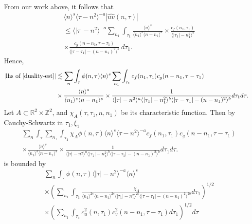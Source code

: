 \documentclass[12pt,reqno]{amsart}
\numberwithin{equation}{section}  %
\newcommand{\rr}{\mathbb{R}}
\newcommand{\zz}{\mathbb{Z}}
\newcommand{\wh}{\widehat}
\begin{document}
%
%
From our work above, it follows that 
%
%
\begin{equation}
	\label{convo-est-starting-pnt}
	\begin{split}
		 & \langle n \rangle^s \langle \tau - n^{2} \rangle^{-a} | \wh{uv}\left( 
		n, \tau \right) |
		\\
		& \le \langle |\tau| - n^{2} \rangle^{-a}
		\sum_{n_{1}} \int_{\tau_{1}} \frac{\langle n \rangle^{s}}{\langle n_1 \rangle^s
    \langle n - n_1 \rangle^s} 
		\times \frac{c_f(n_1, \tau_1)}{\langle |\tau_1| - n_1^{2} \rangle ^{b}}
		\\
		& \times
		\frac{c_g(n - n_1, \tau - \tau_1 )}{\langle |\tau - \tau_1| - (n - n_1)^{2}
    \rangle^{b}}\ d \tau_1.
	\end{split}
\end{equation}
%
%
Hence, 
%
%
\begin{equation}
  \label{pre-fubini-int-form}
	\begin{split}
    |\text{lhs of} \ \eqref{duality-est}|
	& \lesssim \sum_{n} \int_{\tau} \phi(n, \tau) \langle n \rangle^s 
  \sum_{n_{1}}
  \int_{\tau_{1}} c_f(n_1, \tau_1)
		c_g(n - n_1, \tau - \tau_1 )
		\\
    & \times \frac{\langle n \rangle ^{s}}{\langle n_{1} \rangle ^{s} \langle
    n-n_{1} \rangle ^{s}} \times \frac{1}{\langle |\tau| - n^{2} \rangle
    ^{a}\langle |\tau_{1}|-n_{1}^{2} \rangle ^{b}\langle | \tau -
    \tau_{1}|-(n - n_{1})^{2}
    \rangle ^{b}} d \tau_1 d \tau.
	\end{split}
\end{equation}
%
Let $A \subset \rr^{2} \times \zz^{2}$, and $\chi_{A}(\tau, \tau_{1}, n, n_{1})$
be its
characteristic function. Then by Cauchy-Schwartz in
$\tau_{1}, \xi_{1}$
\begin{equation*}
	\begin{split}
    & \sum_{n} \int_{\tau}   \sum_{n_{1}}
    \int_{\tau_{1}} \chi_{A}
    \phi(n, \tau) \langle n \rangle^s \langle \tau - n^{2} \rangle^{-a}
  c_f(n_1, \tau_1)
		c_g(n - n_1, \tau - \tau_1 )
		\\
    & \times \frac{\langle n \rangle ^{s}}{\langle n_{1} \rangle ^{s} \langle
    n-n_{1} \rangle ^{s}} \times \frac{1}{\langle |\tau| - n^{2} \rangle
    ^{a}\langle |\tau_{1}|-n_{1}^{2} \rangle ^{b}\langle | \tau -
    \tau_{1}|-(n - n_{1})^{2}
    \rangle ^{b}} d \tau_1 d \tau.
	\end{split}
\end{equation*}
%
is bounded by 
%
%
\begin{equation}
	\label{10g}
	\begin{split}
    & \sum_{n} \int_{\tau} \phi(n, \tau) \langle | \tau | - n^{2} \rangle
    ^{-a} \langle n \rangle ^{s}
    \\
    & \times \left( \sum_{n_{1}} \int_{\tau_{1}}
    \frac{\chi_{A}}{\langle n_{1} \rangle ^{2s} \langle n-n_{1} \rangle ^{2s} \langle |
    \tau_{1} | - n_{1}^{2}\rangle^{2b}  \langle | \tau - \tau_{1} | -
    (n - n_{1})^{2} \rangle^{2b} } d \tau_{1} \right)^{1/2}
    \\
    & \times \left( \sum_{n_{1}} \int_{\tau_{1}} c_{u}^{2}(n, \tau_{1})
    c_{v}^{2}(n - n_{1}, \tau - \tau_{1}) d \tau_{1} \right)^{1/2} d \tau
  \end{split}
\end{equation}
\end{document}
